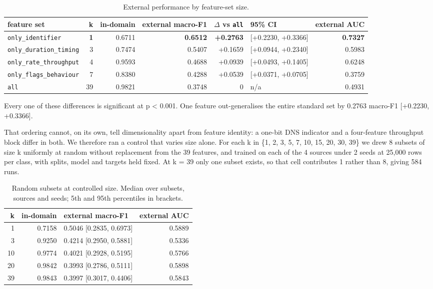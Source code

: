 \documentclass[journal]{IEEEtran}
\begin{document}
\begin{table}[htbp]\centering\scriptsize
\caption{External performance by feature-set size.}
\begin{tabular}{lrrrrlr}
\toprule
feature set & k & in-domain & external macro-F1 & $\Delta$ vs \texttt{all} & 95\% CI & external AUC \\
\midrule
\texttt{only\_identifier} & \textbf{1} & 0.6711 & \textbf{0.6512} & \textbf{+0.2763} & [+0.2230, +0.3366] & \textbf{0.7327} \\
\texttt{only\_duration\_timing} & 3 & 0.7474 & 0.5407 & +0.1659 & [+0.0944, +0.2340] & 0.5983 \\
\texttt{only\_rate\_throughput} & 4 & 0.9593 & 0.4688 & +0.0939 & [+0.0493, +0.1405] & 0.6248 \\
\texttt{only\_flags\_behaviour} & 7 & 0.8380 & 0.4288 & +0.0539 & [+0.0371, +0.0705] & 0.3759 \\
\texttt{all} & 39 & 0.9821 & 0.3748 & 0 & n/a & 0.4931 \\
\bottomrule
\end{tabular}
\end{table}

Every one of these differences is significant at p < 0.001. One feature out-generalises the entire standard set by 0.2763 macro-F1 [+0.2230, +0.3366].

That ordering cannot, on its own, tell dimensionality apart from feature identity: a one-bit DNS indicator and a four-feature throughput block differ in both. We therefore ran a control that varies size alone. For each k in \{1, 2, 3, 5, 7, 10, 15, 20, 30, 39\} we drew 8 subsets of size k uniformly at random without replacement from the 39 features, and trained on each of the 4 sources under 2 seeds at 25,000 rows per class, with splits, model and targets held fixed. At k = 39 only one subset exists, so that cell contributes 1 rather than 8, giving 584 runs.

\begin{table}[htbp]\centering\scriptsize
\caption{Random subsets at controlled size. Median over subsets, sources and seeds; 5th and 95th percentiles in brackets.}
\begin{tabular}{rrlr}
\toprule
k & in-domain & external macro-F1 & external AUC \\
\midrule
1 & 0.7158 & 0.5046 [0.2835, 0.6973] & 0.5889 \\
3 & 0.9250 & 0.4214 [0.2950, 0.5881] & 0.5336 \\
10 & 0.9774 & 0.4021 [0.2928, 0.5195] & 0.5766 \\
20 & 0.9842 & 0.3993 [0.2786, 0.5111] & 0.5898 \\
39 & 0.9843 & 0.3997 [0.3017, 0.4406] & 0.5843 \\
\bottomrule
\end{tabular}
\end{table}
\end{document}
